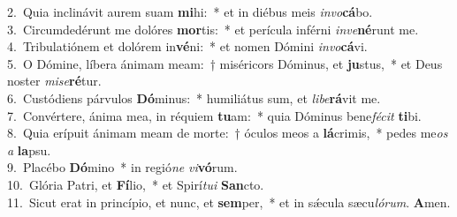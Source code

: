 {2.~}Quia inclinávit aurem suam \textbf{mi}hi:~* et in diébus meis \textit{in}\textit{vo}\textbf{cá}bo.\\
{3.~}Circumdedérunt me dolóres \textbf{mor}tis:~* et perícula inférni \textit{in}\textit{ve}\textbf{né}runt me.\\
{4.~}Tribulatiónem et dolórem in\textbf{vé}ni:~* et nomen Dómini \textit{in}\textit{vo}\textbf{cá}vi.\\
{5.~}O Dómine, líbera ánimam meam:~† miséricors Dóminus, et \textbf{ju}stus,~* et Deus noster \textit{mi}\textit{se}\textbf{ré}tur.\\
{6.~}Custódiens párvulos \textbf{Dó}minus:~* humiliátus sum, et \textit{li}\textit{be}\textbf{rá}vit me.\\
{7.~}Convértere, ánima mea, in réquiem \textbf{tu}am:~* quia Dóminus bene\textit{fé}\textit{cit} \textbf{ti}bi.\\
{8.~}Quia erípuit ánimam meam de morte:~† óculos meos a \textbf{lá}crimis,~* pedes me\textit{os} \textit{a} \textbf{la}psu.\\
{9.~}Placébo \textbf{Dó}mino~* in regió\textit{ne} \textit{vi}\textbf{vó}rum.\\
{10.~}Glória Patri, et \textbf{Fí}lio,~* et Spirí\textit{tu}\textit{i} \textbf{San}cto.\\
{11.~}Sicut erat in princípio, et nunc, et \textbf{sem}per,~* et in sǽcula sæcu\textit{ló}\textit{rum}. \textbf{A}men.\\
